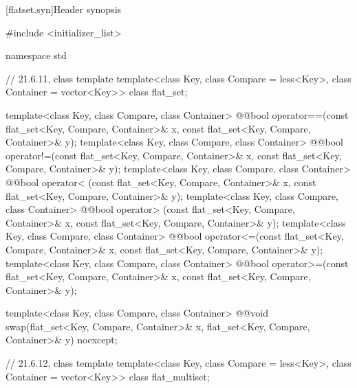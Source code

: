 [flatset.syn]{Header  synopsis}%
%

\begin{codeblock}
#include <initializer_list>

namespace std {
  // 21.6.11, class template 
  template<class Key, class Compare = less<Key>, class Container = vector<Key>>
    class flat_set;

  template<class Key, class Compare, class Container>
    @@bool operator==(const flat_set<Key, Compare, Container>& x,
                              const flat_set<Key, Compare, Container>& y);
  template<class Key, class Compare, class Container>
    @@bool operator!=(const flat_set<Key, Compare, Container>& x,
                              const flat_set<Key, Compare, Container>& y);
  template<class Key, class Compare, class Container>
    @@bool operator< (const flat_set<Key, Compare, Container>& x,
                              const flat_set<Key, Compare, Container>& y);
  template<class Key, class Compare, class Container>
    @@bool operator> (const flat_set<Key, Compare, Container>& x,
                              const flat_set<Key, Compare, Container>& y);
  template<class Key, class Compare, class Container>
    @@bool operator<=(const flat_set<Key, Compare, Container>& x,
                              const flat_set<Key, Compare, Container>& y);
  template<class Key, class Compare, class Container>
    @@bool operator>=(const flat_set<Key, Compare, Container>& x,
                              const flat_set<Key, Compare, Container>& y);

  template<class Key, class Compare, class Container>
    @@void swap(flat_set<Key, Compare, Container>& x,
                        flat_set<Key, Compare, Container>& y) noexcept;

  // 21.6.12, class template 
  template<class Key, class Compare = less<Key>, class Container = vector<Key>>
    class flat_multiset;

}
\end{codeblock}

